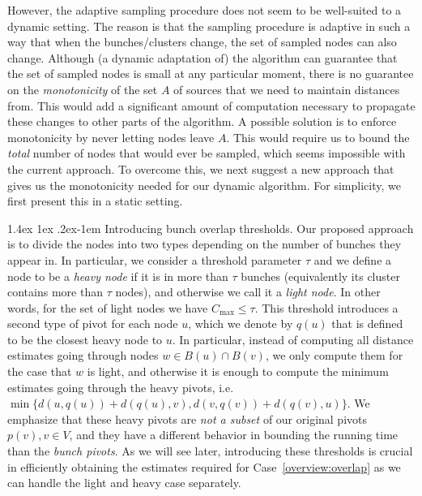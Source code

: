 \documentclass[11pt]{article}
\makeatletter
\theoremstyle{definition}
\theoremstyle{remark}
\newcommand{\mtodo}[1]{\todo[color=red!20]{M: #1}}
\renewcommand{\paragraph}{%
  \@startsection{paragraph}{4}%
  {\z@}{1.4ex \@plus 1ex \@minus .2ex}{-1em}%
  {\normalfont\normalsize\bfseries}%
}
\makeatother
\begin{document}
\begin{titlepage}
However, the adaptive sampling procedure does not seem to be well-suited to a dynamic setting. The reason is that the sampling procedure is adaptive in such a way that when the bunches/clusters change, the set of sampled nodes can also change. Although (a dynamic adaptation of) the algorithm can guarantee that the set of sampled nodes is small at any particular moment, there is no guarantee on the \emph{monotonicity} of the set $A$ of sources that we need to maintain distances from. This would add a significant amount of computation necessary to propagate these changes to other parts of the algorithm. A possible solution is to enforce monotonicity by never letting nodes leave $A$. This would require us to bound the \emph{total} number of nodes that would ever be sampled, which seems impossible with the current approach. 
To overcome this, we next suggest a new approach that gives us the monotonicity needed for our dynamic algorithm. For simplicity, we first present this in a static setting. 



\paragraph{Introducing bunch overlap thresholds.} Our proposed approach is to divide the nodes into two types depending on the number of bunches they appear in.
In particular, we consider a threshold parameter $\tau$ and we define a node to be a \textit{heavy node} if it is in more than $\tau$ bunches (equivalently its cluster contains more than $ \tau $ nodes), and otherwise we call it a \textit{light node}. In other words, for the set of light nodes we have $C_{\max}\leq \tau$. This threshold introduces a second type of pivot for each node $u$, which we denote by $q(u)$ that is defined to be the closest heavy node to $u$. In particular, instead of computing all distance estimates going through nodes $w \in B(u) \cap B(v)$, we only compute them for the case that $w$ is light, and otherwise it is enough to compute the minimum estimates going through the heavy pivots, i.e.~$\min \{ d(u,q(u))+d(q(u),v), d(v,q(v))+d(q(v),u)\}$. We emphasize that these heavy pivots are \textit{not a subset} of our original pivots $p(v), v \in V$, and they have a different behavior in bounding the running time than the \textit{bunch pivots}.
 As we will see later, introducing these thresholds is crucial in efficiently obtaining the estimates required for Case~\ref{overview:overlap} as we can handle the light and heavy case separately.



\end{titlepage}
\end{document}
